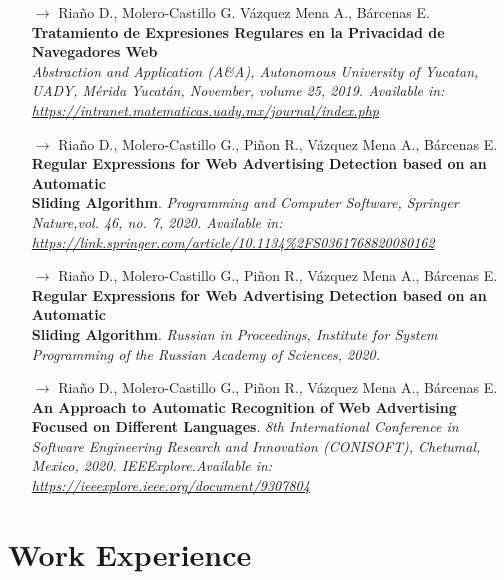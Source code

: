 \documentclass[]{friggeri-cv}
\begin{document}
\begin{itemize}
    \item [$\rightarrow$] Riaño D., Molero-Castillo G. Vázquez Mena A., Bárcenas E.\\
    \textbf{Tratamiento de Expresiones Regulares en la Privacidad de Navegadores Web}\\
    \emph {Abstraction and Application (A\&A), Autonomous University of Yucatan, UADY, Mérida Yucatán, November, volume 25, 2019. Available in:\\ \url{https://intranet.matematicas.uady.mx/journal/index.php}}
    
    \item [$\rightarrow$] Riaño D., Molero-Castillo G., Piñon R., Vázquez Mena A., Bárcenas E.\\
    \textbf{Regular Expressions for Web Advertising Detection based on an Automatic \\Sliding Algorithm}.
    \emph{Programming and Computer Software, Springer Nature,vol. 46, no. 7, 2020. Available in:\\ \url{https://link.springer.com/article/10.1134\%2FS0361768820080162}}
    
    \item [$\rightarrow$] Riaño D., Molero-Castillo G., Piñon R., Vázquez Mena A., Bárcenas E.\\
    \textbf{Regular Expressions for Web Advertising Detection based on an Automatic \\Sliding Algorithm}.
    \emph{Russian in Proceedings, Institute for System Programming of the Russian Academy of Sciences, 2020.}
    
    \item [$\rightarrow$] Riaño D., Molero-Castillo G., Piñon R., Vázquez Mena A., Bárcenas E.\\
    \textbf{An Approach to Automatic Recognition of Web Advertising Focused on Different Languages}.
    \emph{8th International Conference in Software Engineering Research and Innovation (CONISOFT), Chetumal, Mexico, 2020. IEEExplore.Available in:\\
    \url{https://ieeexplore.ieee.org/document/9307804}}
    
\end{itemize}

\section{Work Experience}
\end{document}
